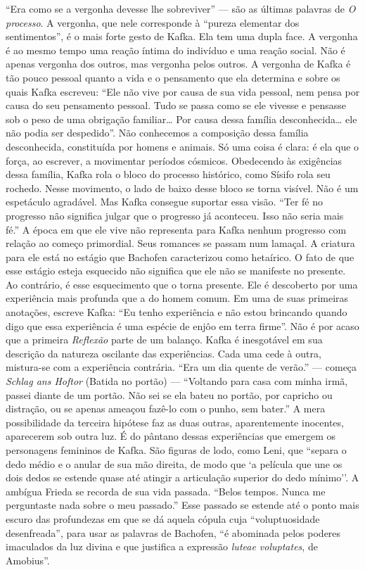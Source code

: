 ``Era como se a vergonha devesse lhe sobreviver'' --- são as últimas
palavras de \textit{O processo}. A vergonha, que nele corresponde à ``pureza
elementar dos sentimentos'', é o mais forte gesto de Kafka. Ela tem uma
dupla face. A vergonha é ao mesmo tempo uma reação íntima do indivíduo e
uma reação social. Não é apenas vergonha dos outros, mas vergonha pelos
outros. A vergonha de Kafka é tão pouco pessoal quanto a vida e o
pensamento que ela determina e sobre os quais Kafka escreveu: ``Ele não
vive por causa de sua vida pessoal, nem pensa por causa do seu
pensamento pessoal. Tudo se passa como se ele vivesse e pensasse sob o
peso de uma obrigação familiar\ldots{} Por causa dessa família
desconhecida\ldots{} ele não podia ser despedido''. Não conhecemos a
composição dessa família desconhecida, constituída por homens e animais.
Só uma coisa é clara: é ela que o força, ao escrever, a movimentar
períodos cósmicos. Obedecendo às exigências dessa família, Kafka rola o
bloco do processo histórico, como Sísifo rola seu rochedo. Nesse
movimento, o lado de baixo desse bloco se torna visível. Não é um
espetáculo agradável. Mas Kafka consegue suportar essa visão. ``Ter fé
no progresso não significa julgar que o progresso já aconteceu. Isso não
seria mais fé.'' A época em que ele vive não representa para Kafka
nenhum progresso com relação ao começo primordial. Seus romances se
passam num lamaçal. A criatura para ele está no estágio que Bachofen
caracterizou como hetaírico. O fato de que esse estágio esteja esquecido
não significa que ele não se manifeste no presente. Ao contrário, é esse
esquecimento que o torna presente. Ele é descoberto por uma experiência
mais profunda que a do homem comum. Em uma de suas primeiras anotações,
escreve Kafka: ``Eu tenho experiência e não estou brincando quando digo
que essa experiência é uma espécie de enjôo em terra firme''. Não é por
acaso que a primeira \textit{Reflexão} parte de um balanço. Kafka é inesgotável
em sua descrição da natureza oscilante das experiências. Cada uma cede à
outra, mistura-se com a experiência contrária. ``Era um dia quente de
verão.'' --- começa \textit{Schlag ans Hoftor} (Batida no portão) ---
``Voltando para casa com minha irmã, passei diante de um portão. Não sei
se ela bateu no portão, por capricho ou distração, ou se apenas ameaçou
fazê-lo com o punho, sem bater.'' A mera possibilidade da terceira
hipótese faz as duas outras, aparentemente inocentes, aparecerem sob
outra luz. É do pântano dessas experiências que emergem os personagens
femininos de Kafka. São figuras de lodo, como Leni, que ``separa o dedo
médio e o anular de sua mão direita, de modo que `a película que une os
dois dedos se estende quase até atingir a articulação superior do dedo
mínimo''. A ambígua Frieda se recorda de sua vida passada. ``Belos
tempos. Nunca me perguntaste nada sobre o meu passado.'' Esse passado se
estende até o ponto mais escuro das profundezas em que se dá aquela
cópula cuja ``voluptuosidade desenfreada'', para usar as palavras de
Bachofen, ``é abominada pelos poderes imaculados da luz divina e que
justifica a expressão \textit{luteae voluptates}, de Amobius''.

